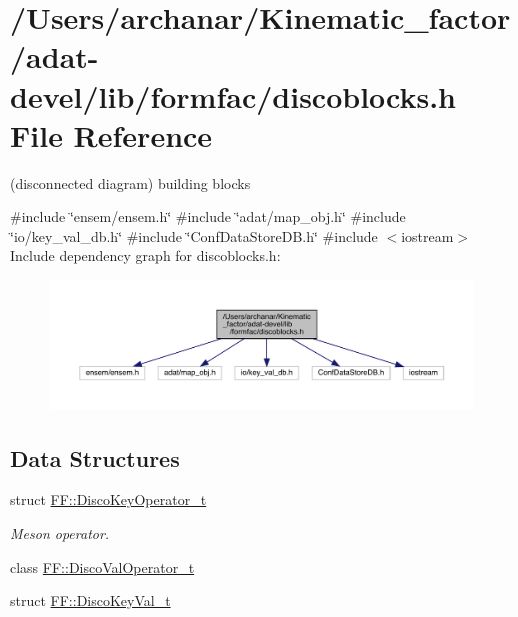 \hypertarget{adat-devel_2lib_2formfac_2discoblocks_8h}{}\section{/\+Users/archanar/\+Kinematic\+\_\+factor/adat-\/devel/lib/formfac/discoblocks.h File Reference}
\label{adat-devel_2lib_2formfac_2discoblocks_8h}


(disconnected diagram) building blocks  


{\ttfamily \#include \char`\"{}ensem/ensem.\+h\char`\"{}}\newline
{\ttfamily \#include \char`\"{}adat/map\+\_\+obj.\+h\char`\"{}}\newline
{\ttfamily \#include \char`\"{}io/key\+\_\+val\+\_\+db.\+h\char`\"{}}\newline
{\ttfamily \#include \char`\"{}Conf\+Data\+Store\+D\+B.\+h\char`\"{}}\newline
{\ttfamily \#include $<$iostream$>$}\newline
Include dependency graph for discoblocks.\+h\+:
\nopagebreak
\begin{figure}[H]
\begin{center}
\leavevmode
\includegraphics[width=350pt]{d9/dbe/adat-devel_2lib_2formfac_2discoblocks_8h__incl}
\end{center}
\end{figure}
\subsection*{Data Structures}
\begin{DoxyCompactItemize}
\item 
struct \mbox{\hyperlink{structFF_1_1DiscoKeyOperator__t}{F\+F\+::\+Disco\+Key\+Operator\+\_\+t}}
\begin{DoxyCompactList}\small\item\em Meson operator. \end{DoxyCompactList}\item 
class \mbox{\hyperlink{classFF_1_1DiscoValOperator__t}{F\+F\+::\+Disco\+Val\+Operator\+\_\+t}}
\item 
struct \mbox{\hyperlink{structFF_1_1DiscoKeyVal__t}{F\+F\+::\+Disco\+Key\+Val\+\_\+t}}
\end{DoxyCompactItemize}

